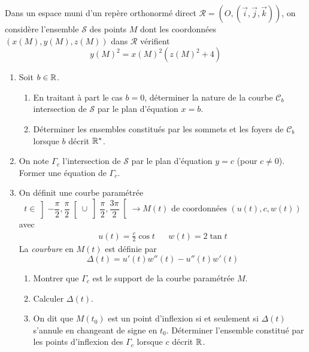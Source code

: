 Dans un espace muni d'un repère orthonormé direct $\mathcal R = (O,(\overrightarrow i ,\overrightarrow j ,\overrightarrow k))$, on considère l'ensemble $\mathcal{S}$ des points $M$ dont les coordonnées $(x(M), y(M), z(M))$ dans $\mathcal{R}$ vérifient
\begin{displaymath}
 y(M)^2 = x(M)^2(z(M)^2+4)
\end{displaymath}
\begin{enumerate}
 \item Soit $b\in \mathbb{R}$.
\begin{enumerate}
 \item En traitant à part le cas $b=0$, déterminer la nature de la courbe $\mathcal C_b$ intersection de $\mathcal S$ par le plan d'équation $x=b$.
 \item Déterminer les ensembles constitués par les sommets et les foyers de $\mathcal C_b$ lorsque $b$ décrit $\mathbb{R}^*$.  
\end{enumerate}
\item On note $\Gamma_c$ l'intersection de $\mathcal S$ par le plan d'équation $y=c$ (pour $c\neq 0$).\\ Former une équation de $\Gamma_c$.
\item On définit une courbe paramétrée 
\begin{displaymath}
 t\in \left] -\frac{\pi}{2},\frac{\pi}{2}\right[ \cup \left] \frac{\pi}{2},\frac{3\pi}{2}\right[
\rightarrow
M(t) \text{ de coordonnées } (u(t),c,w(t))
\end{displaymath}
avec
\begin{align*}
 u(t) = \frac{c}{2}\cos t  & & w(t)=2\tan t 
\end{align*}
La \emph{courbure} en $M(t)$ est définie par
\begin{displaymath}
\Delta(t) = u'(t) w''(t) - u''(t)w'(t)
\end{displaymath}
\begin{enumerate}
 \item Montrer que $\Gamma_c$ est le support de la courbe paramétrée $M$.
 \item Calculer $\Delta(t)$.
 \item On dit que $M(t_0)$ est un point d'inflexion si et seulement si $\Delta(t)$ s'annule en changeant de signe en $t_0$. Déterminer l'ensemble constitué par les points d'inflexion des $\Gamma_c$ lorsque $c$ décrit $\mathbb{R}$.
\end{enumerate}

\end{enumerate}
